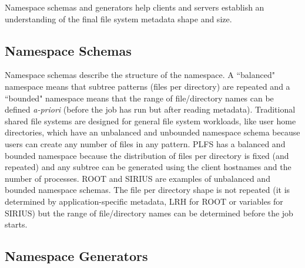  


Namespace schemas and generators help clients and servers establish an
understanding of the final file system metadata shape and size.

\vspace{-0.5em}
\subsection{Namespace Schemas}
\label{sec:namespace-schemas}
\vspace{-0.5em}

Namespace schemas describe the structure of the namespace. A ``balanced"
namespace means that subtree patterns (files per directory) are repeated and a
``bounded" namespace means that the range of file/directory names can be
defined {\it a-priori} (before the job has run but after reading metadata).
Traditional shared file systems are designed for general file system workloads,
like user home directories, which have an unbalanced and unbounded namespace
schema because users can create any number of files in any pattern.  PLFS has a
balanced and bounded namespace because the distribution of files per directory
is fixed (and repeated) and any subtree can be generated using the client
hostnames and the number of processes.  ROOT and SIRIUS are examples of
unbalanced and bounded namespace schemas. The file per directory shape is not
repeated (it is determined by application-specific metadata, LRH for ROOT or
variables for SIRIUS) but the range of file/directory names can be determined
before the job starts.

\vspace{-0.5em}
\subsection{Namespace Generators}
\label{sec:namespace-generators}
\vspace{-0.5em}

